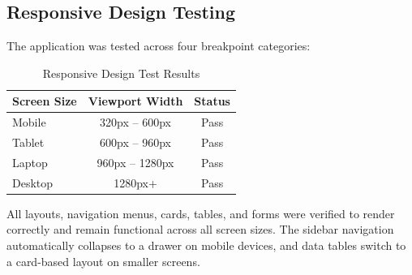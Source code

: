 \subsection{Responsive Design Testing}

The application was tested across four breakpoint categories:

\begin{table}[H]
\centering
\caption{Responsive Design Test Results}
\label{tab:test_responsive}
\begin{tabular}{|l|c|c|}
\hline
\textbf{Screen Size} & \textbf{Viewport Width} & \textbf{Status} \\
\hline
Mobile & 320px -- 600px & Pass \\
\hline
Tablet & 600px -- 960px & Pass \\
\hline
Laptop & 960px -- 1280px & Pass \\
\hline
Desktop & 1280px+ & Pass \\
\hline
\end{tabular}
\end{table}

All layouts, navigation menus, cards, tables, and forms were verified to render correctly and remain functional across all screen sizes. The sidebar navigation automatically collapses to a drawer on mobile devices, and data tables switch to a card-based layout on smaller screens.

